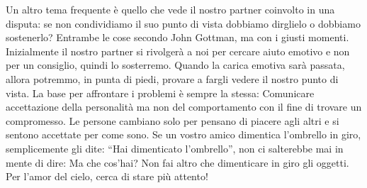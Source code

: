 \documentclass[12pt]{book} %
\begin{document}
Un altro tema frequente è quello che vede il nostro partner coinvolto in una disputa: se non condividiamo il suo punto
di vista dobbiamo dirglielo o dobbiamo sostenerlo? Entrambe le cose secondo John Gottman, ma con i giusti momenti.
Inizialmente il nostro partner si rivolgerà a noi per cercare aiuto emotivo e non per un consiglio, quindi lo
sosterremo. Quando la carica emotiva sarà passata, allora potremmo, in punta di piedi, provare a fargli vedere il
nostro punto di vista. La base per affrontare i problemi è sempre la stessa: Comunicare accettazione della personalità ma non del comportamento con il fine di trovare un compromesso.
Le persone cambiano solo per pensano di
piacere agli altri e si sentono accettate per come sono. Se un vostro amico dimentica l'ombrello
in giro, semplicemente gli dite: “Hai dimenticato l'ombrello”, non ci salterebbe mai in mente di
dire: Ma che cos'hai? Non fai altro che dimenticare in giro gli oggetti. Per
l'amor del cielo, cerca di stare più attento! 
\end{document}
